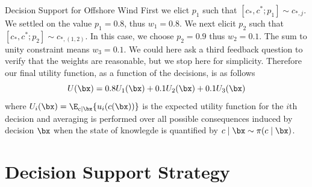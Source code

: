 \begin{chapter}{Decision Support for Offshore Wind \label{Ch:ds-for-ow}}
First we elict $p_1$ such that $[c_{*}, c^{*}; p_1] \sim c_{*, j}$. We settled on the value $p_1 = 0.8$, thus $w_1  = 0.8$. We next elicit $p_2$ such that $[c_{*}, c^{*}; p_2] \sim c_{*, (1,2)}$. In this case, we choose $p_2 = 0.9$ thus $w_2 = 0.1$. The sum to unity constraint means $w_3 = 0.1$. We could here ask a third feedback question to verify that the weights are reasonable, but we stop here for simplicity. Therefore our final utility function, as a function of the decisions, is as follows
\begin{equation}
  U(\bx) =   0.8U_1(\bx) + 0.1 U_2(\bx) + 0.1 U_3(\bx)
\end{equation}
where $U_i(\bx) = \E_{c\mid \bx}\{u_i(c(\bx))\}$ is the expected utility function for the $i$th decision and averaging is performed over all possible consequences induced by decision $\bx$ when the state of knowlegde is quantified by $c \mid \bx \sim \pi(c \mid \bx)$.

\section{Decision Support Strategy}


\end{chapter}
